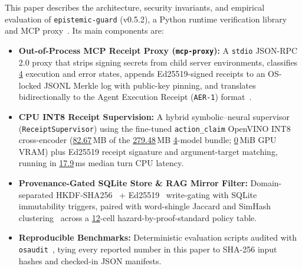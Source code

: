 \documentclass[10pt,twocolumn]{article}
\begin{document}
This paper describes the architecture, security invariants, and empirical evaluation of \texttt{epistemic-guard} (v0.5.2), a Python runtime verification library and MCP proxy~\cite{maxwell2026seed,maxwell2026fivelayer}. Its main components are:
\begin{itemize}
  \item \textbf{Out-of-Process MCP Receipt Proxy (\texttt{mcp-proxy}):} A \texttt{stdio} JSON-RPC\,2.0 proxy that strips signing secrets from child server environments, classifies \href{https://github.com/AlienatedAliens/epistemic-guard/blob/v0.5.2/results/table2_conformance.json\#L31}{4} execution and error states, appends Ed25519-signed receipts to an OS-locked JSONL Merkle log with public-key pinning, and translates bidirectionally to the Agent Execution Receipt (\texttt{AER-1}) format~\cite{zambo2026aer1}.
  \item \textbf{CPU INT8 Receipt Supervision:} A hybrid symbolic--neural supervisor (\texttt{ReceiptSupervisor}) using the fine-tuned \texttt{action\_claim} OpenVINO INT8 cross-encoder (\href{https://github.com/AlienatedAliens/epistemic-guard/blob/v0.5.2/results/table1_architecture.json\#L19}{82.67}\,MB of the \href{https://github.com/AlienatedAliens/epistemic-guard/blob/v0.5.2/results/table1_architecture.json\#L34}{279.48}\,MB \href{https://github.com/AlienatedAliens/epistemic-guard/blob/v0.5.2/results/table1_architecture.json\#L16}{4}-model bundle; \href{https://github.com/AlienatedAliens/epistemic-guard/blob/v0.5.2/results/table3_heldout_supervision.json\#L84}{0}\,MiB GPU VRAM) plus Ed25519 receipt signature and argument-target matching, running in \href{https://github.com/AlienatedAliens/epistemic-guard/blob/v0.5.2/results/table3_heldout_supervision.json\#L86}{17.9}\,ms median turn CPU latency.
  \item \textbf{Provenance-Gated SQLite Store \& RAG Mirror Filter:} Domain-separated HKDF-SHA256~\cite{krawczyk2010rfc5869} + Ed25519~\cite{josefsson2017rfc8032} write-gating with SQLite immutability triggers, paired with word-shingle Jaccard and SimHash clustering~\cite{broder1997resemblance,charikar2002similarity} across a \href{https://github.com/AlienatedAliens/epistemic-guard/blob/v0.5.2/results/table1_architecture.json\#L26}{12}-cell hazard-by-proof-standard policy table.
  \item \textbf{Reproducible Benchmarks:} Deterministic evaluation scripts audited with \texttt{osaudit}~\cite{monperrus2026osaudit}, tying every reported number in this paper to SHA-256 input hashes and checked-in JSON manifests.
\end{itemize}
\end{document}
